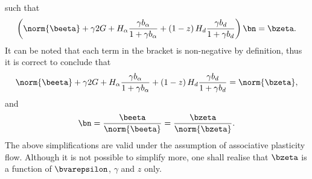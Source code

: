 such that
\begin{gather}
    \left(\norm{\beeta}+\gamma2G+H_\alpha\dfrac{\gamma{}b_\alpha}{1+\gamma{}b_\alpha}+\left(1-z\right)H_d\dfrac{\gamma{}b_d}{1+\gamma{}b_d}\right)\bn=\bzeta.
\end{gather}
It can be noted that each term in the bracket is non-negative by definition, thus it is correct to conclude that
\begin{gather}\label{eq:zeta_norm}
    \norm{\beeta}+\gamma2G+H_\alpha\dfrac{\gamma{}b_\alpha}{1+\gamma{}b_\alpha}+\left(1-z\right)H_d\dfrac{\gamma{}b_d}{1+\gamma{}b_d}=\norm{\bzeta},
\end{gather}
and
\begin{gather}
    \bn=\dfrac{\beeta}{\norm{\beeta}}=\dfrac{\bzeta}{\norm{\bzeta}}.
\end{gather}
The above simplifications are valid under the assumption of associative plasticity flow.
Although it is not possible to simplify more, one shall realise that $\bzeta$ is a function of $\bvarepsilon$, $\gamma$ and $z$ only.